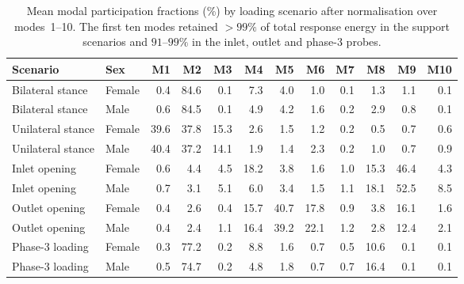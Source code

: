 \documentclass[openacc]{rsproca_new}
\begin{document}
\begin{table}[p]
\centering
\caption{Mean modal participation fractions (\%) by loading scenario after normalisation over modes~1--10. The first ten modes retained $>99\%$ of total response energy in the support scenarios and $91$--$99\%$ in the inlet, outlet and phase-3 probes.}
\label{tab:loadcases}
\begin{tabular}{llrrrrrrrrrr}
\toprule
Scenario & Sex & M1 & M2 & M3 & M4 & M5 & M6 & M7 & M8 & M9 & M10 \\
\midrule
Bilateral stance & Female & 0.4 & 84.6 & 0.1 & 7.3 & 4.0 & 1.0 & 0.1 & 1.3 & 1.1 & 0.1 \\
Bilateral stance & Male   & 0.6 & 84.5 & 0.1 & 4.9 & 4.2 & 1.6 & 0.2 & 2.9 & 0.8 & 0.1 \\
Unilateral stance & Female & 39.6 & 37.8 & 15.3 & 2.6 & 1.5 & 1.2 & 0.2 & 0.5 & 0.7 & 0.6 \\
Unilateral stance & Male   & 40.4 & 37.2 & 14.1 & 1.9 & 1.4 & 2.3 & 0.2 & 1.0 & 0.7 & 0.9 \\
Inlet opening & Female & 0.6 & 4.4 & 4.5 & 18.2 & 3.8 & 1.6 & 1.0 & 15.3 & 46.4 & 4.3 \\
Inlet opening & Male   & 0.7 & 3.1 & 5.1 & 6.0 & 3.4 & 1.5 & 1.1 & 18.1 & 52.5 & 8.5 \\
Outlet opening & Female & 0.4 & 2.6 & 0.4 & 15.7 & 40.7 & 17.8 & 0.9 & 3.8 & 16.1 & 1.6 \\
Outlet opening & Male   & 0.4 & 2.4 & 1.1 & 16.4 & 39.2 & 22.1 & 1.2 & 2.8 & 12.4 & 2.1 \\
Phase-3 loading & Female & 0.3 & 77.2 & 0.2 & 8.8 & 1.6 & 0.7 & 0.5 & 10.6 & 0.1 & 0.1 \\
Phase-3 loading & Male   & 0.5 & 74.7 & 0.2 & 4.8 & 1.8 & 0.7 & 0.7 & 16.4 & 0.1 & 0.1 \\
\bottomrule
\end{tabular}
\end{table}
\end{document}
